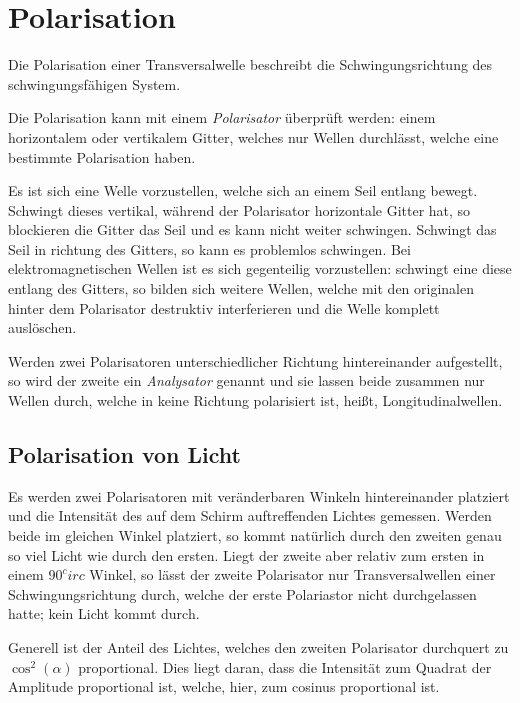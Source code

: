 \documentclass{article}
\begin{document}
\section{Polarisation}
Die Polarisation einer Transversalwelle beschreibt die Schwingungsrichtung des schwingungsfähigen System.
 
Die Polarisation kann mit einem \emph{Polarisator} überprüft werden: einem horizontalem oder vertikalem Gitter, welches nur Wellen durchlässt, welche eine bestimmte Polarisation haben.
 
Es ist sich eine Welle vorzustellen, welche sich an einem Seil entlang bewegt. Schwingt dieses vertikal, während der Polarisator horizontale Gitter hat, so blockieren die Gitter das Seil und es kann nicht weiter schwingen. Schwingt das Seil in richtung des Gitters, so kann es problemlos schwingen. Bei elektromagnetischen Wellen ist es sich gegenteilig vorzustellen: schwingt eine diese entlang des Gitters, so bilden sich weitere Wellen, welche mit den originalen hinter dem Polarisator destruktiv interferieren und die Welle komplett auslöschen.  
 
Werden zwei Polarisatoren unterschiedlicher Richtung hintereinander aufgestellt, so wird der zweite ein \emph{Analysator} genannt und sie lassen beide zusammen nur Wellen durch, welche in keine Richtung polarisiert ist, heißt, Longitudinalwellen.
 
\subsection{Polarisation von Licht}
Es werden zwei Polarisatoren mit veränderbaren Winkeln hintereinander platziert und die Intensität des auf dem Schirm auftreffenden Lichtes gemessen. Werden beide im gleichen Winkel platziert, so kommt natürlich durch den zweiten genau so viel Licht wie durch den ersten. Liegt der zweite aber relativ zum ersten in einem $90^circ$ Winkel, so lässt der zweite Polarisator nur Transversalwellen einer Schwingungsrichtung durch, welche der erste Polariastor nicht durchgelassen hatte; kein Licht kommt durch.
  
Generell ist der Anteil des Lichtes, welches den zweiten Polarisator durchquert zu $\cos^2(\alpha)$ proportional. Dies liegt daran, dass die Intensität zum Quadrat der Amplitude proportional ist, welche, hier, zum cosinus proportional ist.
\end{document}
